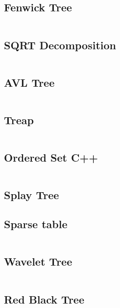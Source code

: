 \documentclass[11pt]{article}
\begin{document}
		\subsection{Fenwick Tree}
		\inputminted[tabsize=2,breaklines,firstline=92,lastline=129,fontsize=\small]{c++}{queries.cpp}
		
		\subsection{SQRT Decomposition}
		\inputminted[tabsize=2,breaklines,firstline=131,lastline=209,fontsize=\small]{c++}{queries.cpp}
		
		\subsection{AVL Tree}
		\inputminted[tabsize=2,breaklines,firstline=211,lastline=414,fontsize=\small]{c++}{queries.cpp}
		
		\subsection{Treap}
		\inputminted[tabsize=2,breaklines,firstline=416,lastline=563,fontsize=\small]{c++}{queries.cpp}
		
		\subsection{Ordered Set C++}
		\inputminted[tabsize=2,breaklines,firstline=653,lastline=686,fontsize=\small]{c++}{queries.cpp}
		
		\subsection{Splay Tree}
		
		
		\subsection{Sparse table}
		\inputminted[tabsize=2,breaklines,firstline=565,lastline=600,fontsize=\small]{c++}{queries.cpp}
		
		\subsection{Wavelet Tree}
		\inputminted[tabsize=2,breaklines,firstline=602,lastline=651,fontsize=\small]{c++}{queries.cpp}
		
		\subsection{Red Black Tree}
		
\end{document}
